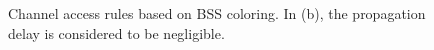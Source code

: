 \documentclass{ieeeaccess}
\begin{document}
\begin{figure}[ht!]
	\centering
	\hspace{1cm}
	\caption{Channel access rules based on BSS coloring. In (b), the propagation delay is considered to be negligible.}
\end{figure}
\end{document}
